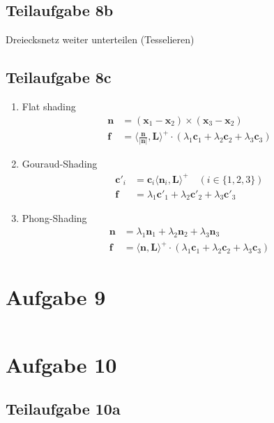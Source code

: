 \documentclass[a4paper]{scrartcl}
\begin{document}
\subsection*{Teilaufgabe 8b}
Dreiecksnetz weiter unterteilen (Tesselieren)
\subsection*{Teilaufgabe 8c}

\begin{enumerate}[label=(\roman*)]
    \item Flat shading
        \begin{align}
        \mathbf{n} &= (\mathbf{x}_1 - \mathbf{x}_2) \times (\mathbf{x}_3 - \mathbf{x}_2)\\
        \mathbf{f} &= \langle \tfrac{\mathbf{n}}{|\mathbf{n}|} , \mathbf{L} \rangle^+ \cdot (\lambda_1 \mathbf{c}_1 + \lambda_2 \mathbf{c}_2 + \lambda_3 \mathbf{c}_3)
        \end{align}
    \item Gouraud-Shading
        \begin{align}
        \mathbf{c}'_i &= \mathbf{c}_i \langle \mathbf{n}_i, \mathbf{L} \rangle^+ \quad (i \in \{1, 2, 3\})\\
        \mathbf{f} &= \lambda_1 \mathbf{c}'_1 + \lambda_2 \mathbf{c}'_2 + \lambda_3 \mathbf{c}'_3
        \end{align}
    \item Phong-Shading
        \begin{align}
        \mathbf{n} &= \lambda_1 \mathbf{n}_1 + \lambda_2 \mathbf{n}_2 + \lambda_3 \mathbf{n}_3\\
        \mathbf{f} &= \langle \mathbf{n} , \mathbf{L} \rangle^+ \cdot (\lambda_1 \mathbf{c}_1 + \lambda_2 \mathbf{c}_2 + \lambda_3 \mathbf{c}_3)
        \end{align}
\end{enumerate}

\section*{Aufgabe 9}
\inputminted[linenos, numbersep=5pt, tabsize=4, frame=lines, label=keyframing.vert]{glsl}{keyframing.vert}

\section*{Aufgabe 10}
\subsection*{Teilaufgabe 10a}
\inputminted[linenos, numbersep=5pt, tabsize=4, frame=lines, label=shader.frag]{glsl}{shader.frag}
\end{document}
